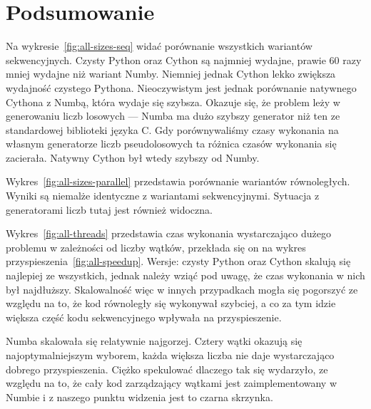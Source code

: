 \section{Podsumowanie}

Na wykresie~\ref{fig:all-sizes-seq} widać porównanie
wszystkich wariantów sekwencyjnych.
Czysty Python oraz Cython są najmniej wydajne,
prawie 60 razy mniej wydajne niż wariant Numby.
Niemniej jednak Cython lekko zwiększa wydajność czystego Pythona.
Nieoczywistym jest jednak porównanie natywnego Cythona z Numbą,
która wydaje się szybsza.
Okazuje się, że problem leży w generowaniu liczb losowych ---
Numba ma dużo szybszy generator niż ten ze standardowej biblioteki
języka C\@.
Gdy porównywaliśmy czasy wykonania na własnym generatorze liczb pseudolosowych
ta różnica czasów wykonania się zacierała.
Natywny Cython był wtedy szybszy od Numby.

Wykres~\ref{fig:all-sizes-parallel} przedstawia porównanie wariantów równoległych.
Wyniki są niemalże identyczne z wariantami sekwencyjnymi.
Sytuacja z generatorami liczb tutaj jest również widoczna.

\begin{figure*}
    \centering
    
    \caption{Czas wykonania algorytmu w zależności od rozmiaru problemu}
    \label{fig:all-sizes-seq}
\end{figure*}


\begin{figure*}
    \centering
    
    \caption{Czas wykonania algorytmu w zależności od rozmiaru problemu}
    \label{fig:all-sizes-parallel}
\end{figure*}

Wykres~\ref{fig:all-threads} przedstawia czas wykonania wystarczająco dużego problemu
w zależności od liczby wątków,
przekłada się on na wykres przyspieszenia~\ref{fig:all-speedup}.
Wersje: czysty Python oraz Cython skalują się najlepiej ze wszystkich,
jednak należy wziąć pod uwagę, że czas wykonania w nich był najdłuższy.
Skalowalność więc w innych przypadkach mogła się pogorszyć ze względu na to,
że kod równoległy się wykonywał szybciej, a co za tym idzie większa
część kodu sekwencyjnego wpływała na przyspieszenie.

Numba skalowała się relatywnie najgorzej.
Cztery wątki okazują się najoptymalniejszym wyborem,
każda większa liczba nie daje wystarczająco dobrego przyspieszenia.
Ciężko spekulować dlaczego tak się wydarzyło, ze względu na to,
że cały kod zarządzający wątkami jest zaimplementowany w Numbie
i z naszego punktu widzenia jest to czarna skrzynka.

